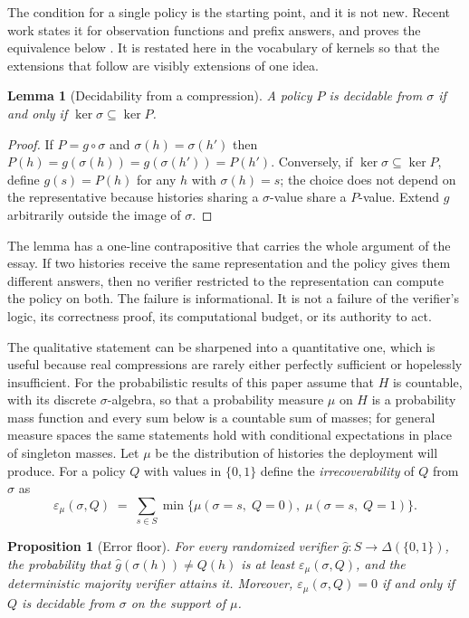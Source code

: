 \documentclass[11pt]{article}
\newtheorem{proposition}{Proposition}
\newtheorem{lemma}{Lemma}
\theoremstyle{definition}
\theoremstyle{remark}
\newcommand{\Hist}{H}
\newcommand{\Bool}{\{0,1\}}
\begin{document}
The condition for a single policy is the starting point, and it is not new. Recent work states it for observation functions and prefix answers, and proves the equivalence below \cite{agenticrv}. It is restated here in the vocabulary of kernels so that the extensions that follow are visibly extensions of one idea.

\begin{lemma}[Decidability from a compression]\label{lem:decid}
A policy $P$ is decidable from $\sigma$ if and only if $\ker\sigma\subseteq\ker P$.
\end{lemma}

\begin{proof}
If $P=g\circ\sigma$ and $\sigma(h)=\sigma(h')$ then $P(h)=g(\sigma(h))=g(\sigma(h'))=P(h')$. Conversely, if $\ker\sigma\subseteq\ker P$, define $g(s)=P(h)$ for any $h$ with $\sigma(h)=s$; the choice does not depend on the representative because histories sharing a $\sigma$-value share a $P$-value. Extend $g$ arbitrarily outside the image of $\sigma$.
\end{proof}

The lemma has a one-line contrapositive that carries the whole argument of the essay. If two histories receive the same representation and the policy gives them different answers, then no verifier restricted to the representation can compute the policy on both. The failure is informational. It is not a failure of the verifier's logic, its correctness proof, its computational budget, or its authority to act.

The qualitative statement can be sharpened into a quantitative one, which is useful because real compressions are rarely either perfectly sufficient or hopelessly insufficient. For the probabilistic results of this paper assume that $\Hist$ is countable, with its discrete $\sigma$-algebra, so that a probability measure $\mu$ on $\Hist$ is a probability mass function and every sum below is a countable sum of masses; for general measure spaces the same statements hold with conditional expectations in place of singleton masses. Let $\mu$ be the distribution of histories the deployment will produce. For a policy $Q$ with values in $\Bool$ define the \emph{irrecoverability} of $Q$ from $\sigma$ as
\[
\varepsilon_\mu(\sigma,Q)\;=\;\sum_{s\in S}\min\bigl\{\mu(\sigma=s,\;Q=0),\;\mu(\sigma=s,\;Q=1)\bigr\}.
\]

\begin{proposition}[Error floor]\label{prop:floor}
For every randomized verifier $\hat g:S\to\Delta(\Bool)$, the probability that $\hat g(\sigma(h))\neq Q(h)$ is at least $\varepsilon_\mu(\sigma,Q)$, and the deterministic majority verifier attains it. Moreover, $\varepsilon_\mu(\sigma,Q)=0$ if and only if $Q$ is decidable from $\sigma$ on the support of $\mu$.
\end{proposition}
\end{document}
